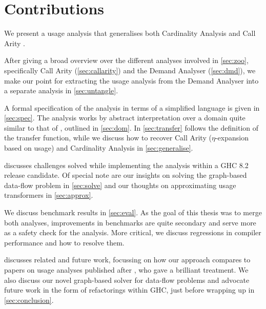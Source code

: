 \section{Contributions}\label{sec:contrib}

We present a usage analysis that generalises both Cardinality Analysis \parencite{card} and Call Arity \parencite{callarity}.

After giving a broad overview over the different analyses involved in \cref{sec:zoo}, specifically Call Arity (\cref{sec:callarity}) and the Demand Analyser (\cref{sec:dmd}), we make our point for extracting the usage analysis from the Demand Analyser into a separate analysis in \ref{sec:untangle}.

A formal specification of the analysis in terms of a simplified language is given in \cref{sec:spec}.
The analysis works by abstract interpretation over a domain quite similar to that of \textcite{card}, outlined in \cref{sec:dom}.
In \cref{sec:transfer} follows the definition of the transfer function, while we discuss how to recover Call Arity (\eg $\eta$-expansion based on usage) and Cardinality Analysis in \cref{sec:generalise}.

 discusses challenges solved while implementing the analysis within a GHC 8.2 release candidate.
Of special note are our insights on solving the graph-based data-flow problem in \cref{sec:solve} and our thoughts on approximating usage transformers in \cref{sec:approx}.

We discuss benchmark results in \cref{sec:eval}.
As the goal of this thesis was to merge both analyses, improvements in benchmarks are quite secondary and serve more as a safety check for the analysis.
More critical, we discuss regressions in compiler performance and how to resolve them.

 discusses related and future work, focussing on how our approach compares to papers on usage analyses published after \textcite{card}, who gave a brilliant treatment.
We also discuss our novel graph-based solver for data-flow problems and advocate future work in the form of refactorings within GHC, just before wrapping up in \cref{sec:conclusion}.


